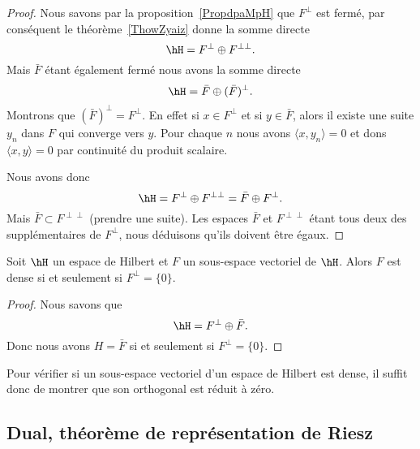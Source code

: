 \begin{proof}
    Nous savons par la proposition~\ref{PropdpaMpH} que \( F^{\perp}\) est fermé, par conséquent le théorème~\ref{ThowZyaiz} donne la somme directe
    \begin{equation}
        \hH=F^{\perp}\oplus F^{\perp\perp}.
    \end{equation}
    Mais \( \bar F\) étant également fermé nous avons la somme directe
    \begin{equation}
        \hH=\bar F\oplus(\bar F)^{\perp}.
    \end{equation}
    Montrons que \( (\bar F)^{\perp}=F^{\perp}\). En effet si \( x\in F^{\perp}\) et si \( y\in \bar F\), alors il existe une suite \( y_n\) dans \( F\) qui converge vers \( y\). Pour chaque \( n\) nous avons \( \langle x, y_n\rangle =0\) et dons \( \langle x, y\rangle =0\) par continuité du produit scalaire.

    Nous avons donc
    \begin{equation}
        \hH=F^{\perp}\oplus F^{\perp\perp}=\bar F\oplus F^{\perp}.
    \end{equation}
    Mais \( \bar F\subset F^{\perp\perp}\) (prendre une suite). Les espaces \( \bar F\) et \( F^{\perp\perp}\) étant tous deux des supplémentaires de \( F^{\perp}\), nous déduisons qu'ils doivent être égaux.
\end{proof}

\begin{proposition}     \label{PropqiWonByiBmc}
    Soit \( \hH\) un espace de Hilbert et \( F\) un sous-espace vectoriel de \( \hH\). Alors \( F\) est dense si et seulement si \( F^{\perp}=\{ 0 \}\).
\end{proposition}

\begin{proof}
    Nous savons que
    \begin{equation}
        \hH=F^{\perp}\oplus \bar F.
    \end{equation}
    Donc nous avons \( H=\bar F\) si et seulement si \( F^{\perp}=\{ 0 \}\).
\end{proof}
Pour vérifier si un sous-espace vectoriel d'un espace de Hilbert est dense, il suffit donc de montrer que son orthogonal est réduit à zéro.

\subsection{Dual, théorème de représentation de Riesz}

